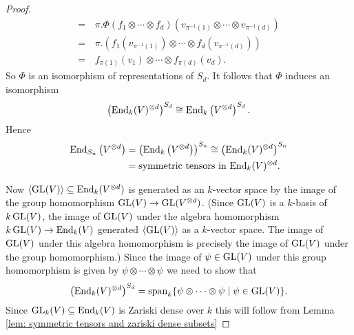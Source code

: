 \begin{proof}
\begin{align*}
    =&\,  \pi.\Phi(f_1 \otimes \dotsb \otimes f_d)\left( v_{\pi^{-1}(1)} \otimes \dotsb \otimes v_{\pi^{-1}(d)} \right) \\
    =&\,  \pi.\left( f_1\left(v_{\pi^{-1}(1)}\right) \otimes \dotsb \otimes f_d\left(v_{\pi^{-1}(d)}\right) \right) \\
    =&\,  f_{\pi(1)}(v_1) \otimes \dotsb \otimes f_{\pi(d)}(v_d).
  \end{align*}
  So $\Phi$ is an isomorphism of representations of $S_d$. It follows that $\Phi$ induces an isomorphism
  \[
          \left( \operatorname{End}_k(V)^{\otimes d} \right)^{S_d}
    \cong \operatorname{End}_k \left(V^{\otimes d}\right)^{S_d}.
  \]
  Hence
  \begin{align*}
          \operatorname{End}_{S_n}\left( V^{\otimes d} \right)
    &=    \left( \operatorname{End}_k\left( V^{\otimes d} \right) \right)^{S_n}
    \cong \left( \operatorname{End}_k(V)^{\otimes d} \right)^{S_n} \\
    &=    \text{symmetric tensors in $\operatorname{End}_k(V)^{\otimes d}$}.
  \end{align*}
  
  Now $\left\langle \operatorname{GL}(V) \right\rangle \subseteq \operatorname{End}_k(V^{\otimes d})$ is generated as an $k$-vector space by the image of the group homomorphism $\operatorname{GL}(V) \to \operatorname{GL}(V^{\otimes d})$.
  (Since $\operatorname{GL}(V)$ is a $k$-basis of $k\operatorname{GL}(V)$, the image of $\operatorname{GL}(V)$ under the algebra homomorphism $k \operatorname{GL}(V) \to \operatorname{End}_k(V)$ generated $\left\langle \operatorname{GL}(V) \right\rangle$ as a $k$-vector space.
  The image of $\operatorname{GL}(V)$ under this algebra homomorphism is precisely the image of $\operatorname{GL}(V)$ under the group homomorphism.)
  Since the image of $\psi \in \operatorname{GL}(V)$ under this group homomorphism is given by $\psi \otimes \dotsb \otimes \psi$ we need to show that
  \[
      \left( \operatorname{End}_k(V)^{\otimes d} \right)^{S_d}
    = \operatorname{span}_k  \{
                  \psi \otimes \dotsb \otimes \psi
                \mid
                  \psi \in \operatorname{GL}(V)
                \}.
  \]
  Since $\operatorname{GL}_k(V) \subseteq \operatorname{End}_k(V)$ is Zariski dense over $k$ this will follow from Lemma \ref{lem: symmetric tensors and zariski dense subsets}
\end{proof}


